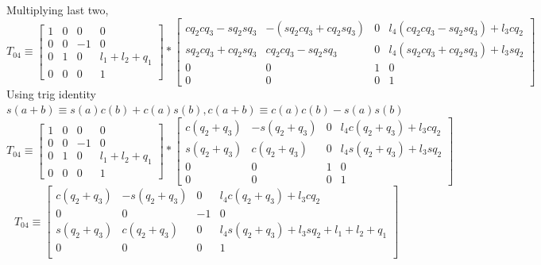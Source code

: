 \documentclass[12pt]{article}
\begin{document}
Multiplying last two,
\[
  T_{04} \equiv
  \begin{bmatrix} 1 & 0 & 0 & 0 \\ 0 & 0 & -1 & 0 \\ 0 & 1 & 0 & l_1 + l_2 + q_1 \\ 0 & 0 & 0 & 1 \end{bmatrix}
  *
  \begin{bmatrix}
    cq_2cq_3 - sq_2sq_3 & -(sq_2cq_3 + cq_2sq_3) & 0 & l_4(cq_2cq_3 - sq_2sq_3) + l_3cq_2 \\
    sq_2cq_3 + cq_2sq_3 & cq_2cq_3 - sq_2sq_3    & 0 & l_4(sq_2cq_3 + cq_2sq_3) + l_3sq_2 \\
    0                   & 0                      & 1 & 0 \\
    0                   & 0                      & 0 & 1
  \end{bmatrix}
\]
Using trig identity $s(a + b) \equiv s(a)c(b) + c(a)s(b), c(a + b) \equiv c(a)c(b) - s(a)s(b)$
\[
  T_{04} \equiv
  \begin{bmatrix} 1 & 0 & 0 & 0 \\ 0 & 0 & -1 & 0 \\ 0 & 1 & 0 & l_1 + l_2 + q_1 \\ 0 & 0 & 0 & 1 \end{bmatrix}
  *
  \begin{bmatrix}
    c(q_2 + q_3) & -s(q_2 + q_3) & 0 & l_4c(q_2 + q_3) + l_3cq_2 \\
    s(q_2 + q_3) & c(q_2 + q_3)  & 0 & l_4s(q_2 + q_3) + l_3sq_2 \\
    0            & 0             & 1 & 0 \\
    0            & 0             & 0 & 1
  \end{bmatrix}
\]
\[
  T_{04} \equiv
  \begin{bmatrix}
    c(q_2 + q_3) & -s(q_2 + q_3) & 0 & l_4c(q_2 + q_3) + l_3cq_2 \\
    0 & 0 & -1 & 0 \\
    s(q_2 + q_3) & c(q_2 + q_3)  & 0 & l_4s(q_2 + q_3) + l_3sq_2 + l_1 + l_2 + q_1 \\
    0 & 0 & 0 & 1 \\
  \end{bmatrix}
\]

\pagebreak
\end{document}
